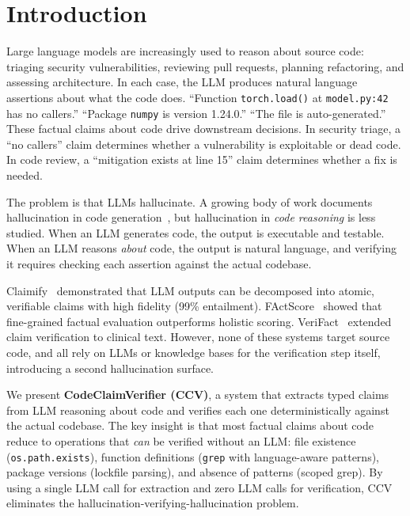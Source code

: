 \section{Introduction}
\label{sec:introduction}

Large language models are increasingly used to reason about source code: triaging security vulnerabilities, reviewing pull requests, planning refactoring, and assessing architecture. In each case, the LLM produces natural language assertions about what the code does. ``Function \texttt{torch.load()} at \texttt{model.py:42} has no callers.'' ``Package \texttt{numpy} is version 1.24.0.'' ``The file is auto-generated.'' These factual claims about code drive downstream decisions. In security triage, a ``no callers'' claim determines whether a vulnerability is exploitable or dead code. In code review, a ``mitigation exists at line 15'' claim determines whether a fix is needed.

The problem is that LLMs hallucinate. A growing body of work documents hallucination in code generation~\cite{chen2021codex, pearce2022security}, but hallucination in \emph{code reasoning} is less studied. When an LLM generates code, the output is executable and testable. When an LLM reasons \emph{about} code, the output is natural language, and verifying it requires checking each assertion against the actual codebase.

Claimify~\cite{metropolitansky2025claimify} demonstrated that LLM outputs can be decomposed into atomic, verifiable claims with high fidelity (99\% entailment). FActScore~\cite{min2023factscore} showed that fine-grained factual evaluation outperforms holistic scoring. VeriFact~\cite{wei2024verifact} extended claim verification to clinical text. However, none of these systems target source code, and all rely on LLMs or knowledge bases for the verification step itself, introducing a second hallucination surface.

We present \textbf{CodeClaimVerifier (CCV)}, a system that extracts typed claims from LLM reasoning about code and verifies each one deterministically against the actual codebase. The key insight is that most factual claims about code reduce to operations that \emph{can} be verified without an LLM: file existence (\texttt{os.path.exists}), function definitions (\texttt{grep} with language-aware patterns), package versions (lockfile parsing), and absence of patterns (scoped grep). By using a single LLM call for extraction and zero LLM calls for verification, CCV eliminates the hallucination-verifying-hallucination problem.


